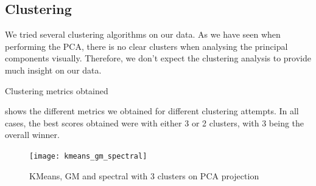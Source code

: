 \subsection{Clustering}%
\label{sub:clustering}

We tried several clustering algorithms on our data. As we have seen when performing the PCA, there is
no clear clusters when analysing the principal components visually. Therefore, we don't expect the
clustering analysis to provide much insight on our data.

\begin{table}[htp]
\caption{Clustering metrics obtained}%
\label{tab:clustering_metrics}

\end{table}

 shows the different metrics we obtained for different clustering
attempts. In all cases, the best scores obtained were with either 3 or 2 clusters, with
3 being the overall winner.



\begin{figure}[H]
  \texttt{[image: kmeans\_gm\_spectral]}
  \caption{KMeans, GM and spectral with 3 clusters on PCA projection}%
  \label{fig:kmeans-gm}
\end{figure}